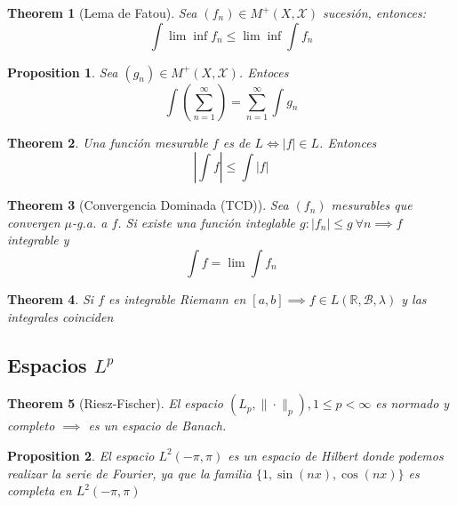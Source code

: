 \documentclass[leqno]{article}
\newtheorem*{theorem}{Theorem}
\newtheorem*{proposition}{Proposition}
\begin{document}
\begin{theorem}[Lema de Fatou]
Sea $(f_n) \in M^+(X, \mathcal{X})$ sucesión, entonces:
\[
\int \lim \inf f_n \le \lim \inf \int f_n
\] 
\end{theorem}

\begin{proposition} Sea $(g_n) \in M^+(X, \mathcal{X})$. Entoces
  \[
 \int \left( \sum_{n=1}^\infty \right)  =\sum_{n=1}^\infty \int g_n
  \] 
\end{proposition}

\begin{theorem} Una función mesurable $f$ es de $L \iff  |f|\in L$. Entonces
  \[
|\int f|\le \int |f|  
  \] 
\end{theorem}

\begin{theorem}[Convergencia Dominada (TCD)]
Sea $(f_n)$ mesurables que convergen $\mu$-g.a. a $f$. Si existe una función integlable $g: |f_n|\le g \ \forall n \implies f$ integrable y
\[
\int f = \lim \int f_n
\] 
\end{theorem}

\begin{theorem} Si $f$ es integrable Riemann en $[a, b] \implies f\in L(\mathbb{R}, \mathcal{B}, \lambda )$ y las integrales coinciden
\end{theorem}

\subsection{Espacios $L^p$}
\begin{theorem}[Riesz-Fischer]
 El espacio $(L_p, \|\cdot \|_{p}), 1\le p <\infty$ es normado y completo $\implies$ es un espacio de Banach.
\end{theorem}


\begin{proposition}
El espacio $L^2(-\pi, \pi)$ es un espacio de Hilbert donde podemos realizar la serie de Fourier, ya que la familia $\{1, \sin(nx), \cos(nx)\}$ es completa en $L^2(-\pi, \pi)$
\end{proposition}
\end{document}
